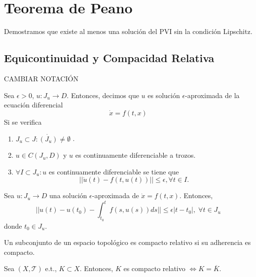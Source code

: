 \section{Teorema de Peano}

\begin{note}
  Demostramos que existe al menos una solución del PVI sin la condición Lipschitz.
\end{note}

\subsection{Equicontinuidad y Compacidad Relativa}

CAMBIAR NOTACIÓN

\begin{defn}
  Sea $\epsilon > 0$, $u: J_{u} \to D$. Entonces, decimos que $u$ es solución $\epsilon$-aproximada de la ecuación diferencial \[ 
    \dot{x} = f(t,x) 
  \] 
  Si se verifica
  \begin{enumerate}[label=(\roman*)]
    \item $J_{u} \subset J : \mathring{(J_{u})} \neq \emptyset$ .
    \item $u \in C(J_{u}, D)$ y $u$ es continuamente diferenciable a trozos.
    \item $\forall I \subset J_{u}: u$ es continuamente diferenciable se tiene que
      \[ 
        ||\dot{u}(t) - f(t, u(t))|| \leq \epsilon, \forall t \in I. 
      \] 
  \end{enumerate}
\end{defn}

\begin{obs}
  Sea $u : J_{u} \to D$ una solución $\epsilon$-aproximada de $\dot{x} = f(t,x)$. Entonces,
  \[ 
    ||u(t) - u(t_{0}) - \int_{t_{0}}^{t} f(s, u(s)) ds|| \leq \epsilon | t - t_{0} |, \; \forall t \in J_{u}
  \] 
  donde $t_{0} \in J_{u}$.
\end{obs}

\begin{defn}
  Un subconjunto de un espacio topológico es compacto relativo si su adherencia es compacto.
\end{defn}

\begin{prop}
  Sea $( X, \mathcal{T} )$ e.t., $K \subset X$. Entonces, $K$ es compacto relativo $\Leftrightarrow K = \overline{K}$.
\end{prop}

